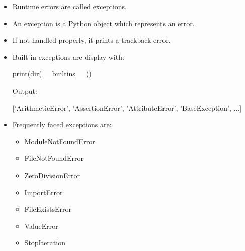 \setlength{\columnsep}{3pt}
\begin{flushleft}
	\bigskip
	\begin{itemize}
		\item Runtime  errors are called exceptions.
		\item An exception is a Python object which represents an error. 
		\item If not handled properly, it prints a trackback error.
		\item Built-in exceptions are display with:
		\begin{tcolorbox}[breakable,notitle,boxrule=-0pt,colback=code,colframe=code]
			\color{white}
			\font=8pt
			print(dir(\_\_builtins\_\_))
			\font=4pt
		\end{tcolorbox}
	
		Output:
		\begin{tcolorbox}[breakable,notitle,boxrule=-0pt,colback=output,colframe=output]
			\color{black}
			['ArithmeticError', 'AssertionError', 'AttributeError', 'BaseException',
			\newline
			...]
			\font=4pt
		\end{tcolorbox}		
	
		\item Frequently faced exceptions are:
		\begin{itemize}
			\item ModuleNotFoundError 
			\item FileNotFoundError
			\item ZeroDivisionError
			\item ImportError
			\item FileExistsError
			\item ValueError
			\item StopIteration
		\end{itemize}
	
	
	\end{itemize}
	
\end{flushleft}

\newpage

